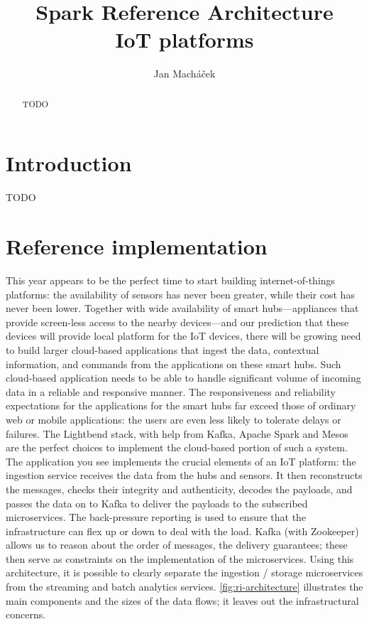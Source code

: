 \documentclass[a4paper, 10 pt, conference]{IEEEtran}
\title{Spark Reference Architecture \\ IoT platforms}
\author{Jan Mach{\'a}\v{c}ek%
}
\begin{document}
\maketitle
\thispagestyle{empty}
\pagestyle{empty}

\begin{abstract}

TODO

\end{abstract}


\section{Introduction}

TODO

\section{Reference implementation}

This year appears to be the perfect time to start building internet-of-things platforms: the availability of sensors has never been greater, while their cost has never been lower. Together with wide availability of smart hubs---appliances that provide screen-less access to the nearby devices---and our prediction that these devices will provide local platform for the IoT devices, there will be growing need to build larger cloud-based applications that ingest the data, contextual information, and commands from the applications on these smart hubs.
Such cloud-based application needs to be able to handle significant volume of incoming data in a reliable and responsive manner. The responsiveness and reliability expectations for the applications for the smart hubs far exceed those of ordinary web or mobile applications: the users are even less likely to tolerate delays or failures. 
The Lightbend stack, with help from Kafka, Apache Spark and Mesos are the perfect choices to implement the cloud-based portion of such a system. The application you see implements the crucial elements of an IoT platform: the ingestion service receives the data from the hubs and sensors. It then reconstructs the messages, checks their integrity and authenticity, decodes the payloads, and passes the data on to Kafka to deliver the payloads to the subscribed microservices. The back-pressure reporting is used to ensure that the infrastructure can flex up or down to deal with the load. Kafka (with Zookeeper) allows us to reason about the order of messages, the delivery guarantees; these then serve as constraints on the implementation of the microservices. Using this architecture, it is possible to clearly separate the ingestion / storage microservices from the streaming and batch analytics services. \autoref{fig:ri-architecture} illustrates the main components and the sizes of the data flows; it leaves out the infrastructural concerns.
\end{document}
